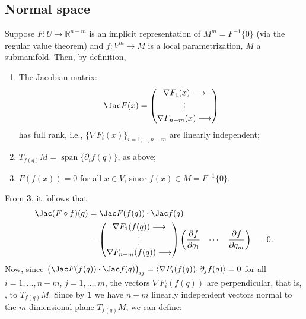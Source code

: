 \begin{center}
\end{center}

\subsection{Normal space}

Suppose $F : U \to \mathbb{R}^{n-m}$ is an implicit representation of $M^m = F^{-1}\{0\}$ (via the
regular value theorem) and $f : V^m \to M$ is a local parametrization, $M$ a submanifold. Then, by
definition,
\begin{enumerate}[label=\textbf{\arabic*.}]
  \item The Jacobian matrix:
\[ \Jac F(x) = \begin{pmatrix} \nabla F_1(x) \longrightarrow \\ \vdots \\ \nabla F_{n-m}(x) \longrightarrow \end{pmatrix} \]
    has full rank, i.e., $\{\nabla F_i(x)\}_{i=1,\dots,n-m}$ are linearly independent;
  \item $T_{f(q)}M = \operatorname{span}\{\partial_if(q)\}$, as above;
  \item $F(f(x)) = 0$ for all $x \in V$, since $f(x) \in M = F^{-1}\{0\}$.
\end{enumerate}
From \textbf{3}, it follows that
\begin{align*}
\Jac(F\circ f)(q)
  &= \Jac F(f(q))\cdot\Jac f(q) \\
  &= \begin{pmatrix} \nabla F_1(f(q)) \longrightarrow \\ \vdots \\ \nabla F_{n-m}(f(q)) \longrightarrow \end{pmatrix}
     \begin{pmatrix} \dfrac{\partial f}{\partial q_1} & \cdots & \dfrac{\partial f}{\partial q_m}\end{pmatrix}
   \;=\; 0.
\end{align*}
Now, since $\big(\Jac F(f(q))\cdot\Jac f(q)\big)_{ij} = \langle \nabla F_i(f(q)), \partial_jf(q)\rangle = 0$
for all $i=1,\dots,n-m$, $j=1,\dots,m$, the vectors $\nabla F_i(f(q))$ are perpendicular, that is,
, to $T_{f(q)}M$. Since by \textbf{1} we have $n-m$ linearly independent vectors
normal to the $m$-dimensional plane $T_{f(q)}M$, we can define:

